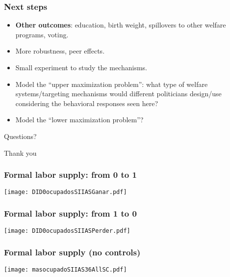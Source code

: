 \documentclass{beamer}
\begin{document}
\begin{frame}
\frametitle{Next steps}
\begin{itemize}
	\item \textbf{Other outcomes}: education, birth weight, spillovers to other welfare programs, {\color{gray}voting}.
	\item More robustness, peer effects.
	\item {\color{gray}Small experiment to study the mechanisms.}
	\item {\color{gray}Model the ``upper maximization problem'': what type of welfare systems/targeting mechanisms would different politicians design/use considering the behavioral responses seen here?}
	\item {\color{gray}Model the ``lower maximization problem''?}	
\end{itemize}
\end{frame}



\begin{frame}
\begin{center}
	{\Huge Questions?\par}
\end{center}
\end{frame}

\begin{frame}
\begin{center}
	{\Huge Thank you\par}
\end{center}
\end{frame}

\begin{frame}[label=flabor01]
\frametitle{Formal labor supply: from 0 to 1}
\begin{center}
	\texttt{[image: DID0ocupadosSIIASGanar.pdf]}
	\label{DID0ocupadosSIIASGanar}
\end{center}
\hyperlink{flabor02}{}
\end{frame}

\begin{frame}[label=flabor10]
\frametitle{Formal labor supply: from 1 to 0}
\begin{center}
\texttt{[image: DID0ocupadosSIIASPerder.pdf]}
\label{DID0ocupadosSIIASPerder}
\end{center}
\hyperlink{flabor20}{}
\end{frame}

\begin{frame}[shrink=5, label=masocupadoSIIAS36AllSC]
\frametitle{Formal labor supply (no controls)}
\begin{center}
	\texttt{[image: masocupadoSIIAS36AllSC.pdf]}
	\label{masocupadoSIIAS36AllSC}
\end{center}
\hyperlink{masocupadoSIIAS36AllWC}{}
\end{frame}
\end{document}
